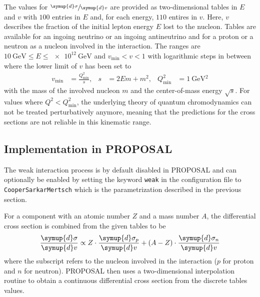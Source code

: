 The values for $\sfrac{\symup{d}\sigma}{\symup{d}v}$ are provided as two-dimensional tables in $E$ and $v$ with $\num{100}$ entries in $E$ and, for each energy, $\num{110}$ entires in $v$.  
Here, $v$ describes the fraction of the initial lepton energy $E$ lost to the nucleon.
Tables are available for an ingoing neutrino or an ingoing antineutrino and for a proton or a neutron as a nucleon involved in the interaction.
The ranges are $\SI{10}{\giga\electronvolt} \leq E \leq \SI{e12}{\giga\electronvolt}$ and $v_\text{min} < v < 1$ with logarithmic steps in between where the lower limit of $v$ has been set to
%
\begin{align}
    v_\text{min} &= \frac{Q^2_{\text{min}}}{s}, & s &= 2 E m + m^2, & Q^2_{\text{min}} &= \SI{1}{\giga\electronvolt^2}
\end{align}
%
with the mass of the involved nucleon $m$ and the center-of-mass energy $\sqrt{s}$.
For values where $Q^2 < Q_\text{min}^2$, the underlying theory of quantum chromodynamics can not be treated perturbatively anymore, meaning that the predictions for the cross sections are not reliable in this kinematic range. 

\subsection{Implementation in PROPOSAL}

\begin{sloppypar}
The weak interaction process is by default disabled in PROPOSAL and can optionally be enabled by setting the keyword \texttt{weak} in the configuration file to \texttt{CooperSarkarMertsch} which is the parametrization described in the previous section.
\end{sloppypar}
For a component with an atomic number $Z$ and a mass number $A$, the differential cross section is combined from the given tables to be
%
\begin{equation}
	\frac{\symup{d}\sigma}{\symup{d}v} \propto Z \cdot \frac{\symup{d}\sigma_p}{\symup{d}v} + (A - Z) \cdot \frac{\symup{d}\sigma_n}{\symup{d}v}
\end{equation}
%
where the subscript refers to the nucleon involved in the interaction ($p$ for proton and $n$ for neutron).
PROPOSAL then uses a two-dimensional interpolation routine to obtain a continuous differential cross section from the discrete tables values.

